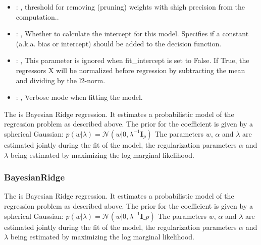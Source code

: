 \begin{itemize}
    \item {}: , 
      threshold for removing (pruning) weights with
      shigh precision from the computation..

    \item {}: , 
      Whether to calculate the intercept for this model. Specifies if a constant (a.k.a. bias or
      intercept)                                                   should be added to the decision
      function.

    \item {}: , 
      This parameter is ignored when fit\_intercept is set to False. If True,
      the regressors X will be normalized before regression by subtracting the mean and
      dividing by the l2-norm.

    \item {}: , 
      Verbose mode when fitting the model.
  \end{itemize}
 The  is Bayesian Ridge regression.                         It estimates a
 probabilistic model of the regression problem as                         described above. The prior
 for the coefficient is given by a                         spherical Gaussian:
 $p(w|\lambda) = \mathcal{N}(w|0,\lambda^{-1}\mathbf{I}_{p})$                         The parameters
 $w$, $\alpha$ and $\lambda$ are estimated jointly during                         the fit of the
 model, the regularization parameters $\alpha$ and $\lambda$                         being estimated
 by maximizing the log marginal likelihood.

\subsubsection{BayesianRidge}
  The  is Bayesian Ridge regression.                         It estimates a
  probabilistic model of the regression problem as                         described above. The
  prior for the coefficient is given by a                         spherical Gaussian:
  $p(w|\lambda) = \mathcal{N}(w|0,\lambda^{-1}\mathbf{I}\_{p})$                         The
  parameters $w$, $\alpha$ and $\lambda$ are estimated jointly during                         the
  fit of the model, the regularization parameters $\alpha$ and $\lambda$
  being estimated by maximizing the log marginal likelihood.

